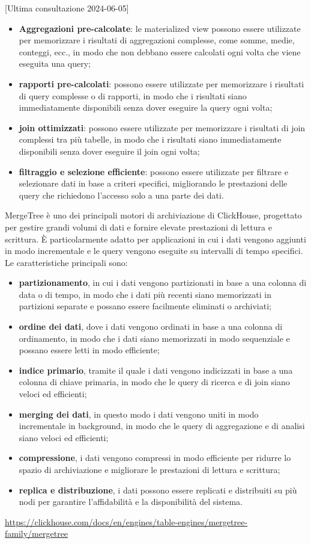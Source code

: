 [Ultima consultazione 2024-06-05]

\begin{itemize}
	\item \textbf{Aggregazioni pre-calcolate}: le materialized view possono essere utilizzate per memorizzare i risultati di aggregazioni complesse, come somme, medie, conteggi, ecc., in modo che non debbano essere calcolati ogni volta che viene eseguita una query;
	\item \textbf{rapporti pre-calcolati}: possono essere utilizzate per memorizzare i risultati di query complesse o di rapporti, in modo che i risultati siano immediatamente disponibili senza dover eseguire la query ogni volta;
	\item \textbf{join ottimizzati}: possono essere utilizzate per memorizzare i risultati di join complessi tra più tabelle, in modo che i risultati siano immediatamente disponibili senza dover eseguire il join ogni volta;
	\item \textbf{filtraggio e selezione efficiente}: possono essere utilizzate per filtrare e selezionare dati in base a criteri specifici, migliorando le prestazioni delle query che richiedono l'accesso solo a una parte dei dati.
\end{itemize}
MergeTree è uno dei principali motori di archiviazione di ClickHouse, progettato per gestire grandi volumi di dati e fornire elevate prestazioni di lettura e scrittura. È particolarmente adatto per applicazioni in cui i dati vengono aggiunti in modo incrementale e le query vengono eseguite su intervalli di tempo specifici.
Le caratteristiche principali sono:
\begin{itemize}
	\item \textbf{partizionamento}, in cui i dati vengono partizionati in base a una colonna di data o di tempo, in modo che i dati più recenti siano memorizzati in partizioni separate e possano essere facilmente eliminati o archiviati;
	\item \textbf{ordine dei dati}, dove i dati vengono ordinati in base a una colonna di ordinamento, in modo che i dati siano memorizzati in modo sequenziale e possano essere letti in modo efficiente;
	\item \textbf{indice primario}, tramite il quale i dati vengono indicizzati in base a una colonna di chiave primaria, in modo che le query di ricerca e di join siano veloci ed efficienti;
	\item \textbf{merging dei dati}, in questo modo i dati vengono uniti in modo incrementale in background, in modo che le query di aggregazione e di analisi siano veloci ed efficienti;
	\item \textbf{compressione}, i dati vengono compressi in modo efficiente per ridurre lo spazio di archiviazione e migliorare le prestazioni di lettura e scrittura;
	\item \textbf{replica e distribuzione}, i dati possono essere replicati e distribuiti su più nodi per garantire l'affidabilità e la disponibilità del sistema.
\end{itemize}
\url{https://clickhouse.com/docs/en/engines/table-engines/mergetree-family/mergetree}

